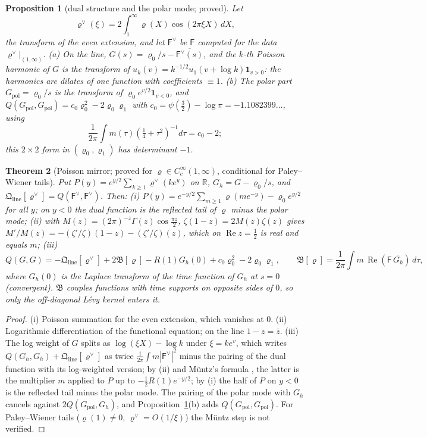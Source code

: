 \documentclass[11pt]{amsart}
\newtheorem{theorem}{Theorem}[section]
\newtheorem{proposition}[theorem]{Proposition}
\theoremstyle{definition}
\theoremstyle{remark}
\newcommand{\R}{\mathbb R}
\newcommand{\Rel}{\operatorname{Re}}
\begin{document}
\begin{proposition}[dual structure and the polar mode; proved]\label{prop:ext-dual}
Let
\[\varrho^\vee(\xi)=2\int_1^\infty\varrho(X)\cos(2\pi\xi X)\,dX,\]
the transform of the even extension, and let $\mathsf F^\vee$ be
$\mathsf F$ computed for the data $\varrho^\vee|_{(1,\infty)}$.
(a) On the line, $G(s)=\varrho_0/s-\overline{\mathsf F^\vee(s)}$, and the $k$-th
Poisson harmonic of $G$ is the transform of $u_k(v)=k^{-1/2}u_1(v+\log k)\mathbf 1_{v>0}$: the harmonics are dilates of one
function with coefficients $\equiv1$. (b) The polar part $G_{\mathrm{pol}}=\varrho_0/s$ is the transform of
$\varrho_0e^{v/2}\mathbf 1_{v<0}$, and $Q(G_{\mathrm{pol}},G_{\mathrm{pol}})=c_0\varrho_0^2-2\varrho_0\varrho_1$ with
$c_0=\psi(\frac32)-\log\pi=-1.1082399\ldots$, using
\[\frac1{2\pi}\int m(\tau)(\tfrac14+\tau^2)^{-1}d\tau=c_0-2;\]
this $2\times2$ form
in $(\varrho_0,\varrho_1)$ has determinant $-1$.
\end{proposition}

\begin{theorem}[Poisson mirror; proved for $\varrho\in C_c^\infty(1,\infty)$, conditional for Paley--Wiener tails]\label{thm:ext-mirror}
Put $P(y)=e^{y/2}\sum_{k\ge1}\varrho^\vee(ke^y)$ on $\R$, $G_h=G-\varrho_0/s$, and
$\mathfrak Q_{\mathrm{line}}[\varrho^\vee]=Q(\mathsf F^\vee,\mathsf F^\vee)$. Then:
(i) $P(y)=e^{-y/2}\sum_{m\ge1}\varrho(me^{-y})-\varrho_0e^{y/2}$ for all $y$; on $y<0$ the dual function is the reflected tail of
$\varrho$ minus the polar mode;
(ii) with $M(z)=(2\pi)^{-z}\Gamma(z)\cos\frac{\pi z}2$, $\zeta(1-z)=2M(z)\zeta(z)$ gives $M'/M(z)=-(\zeta'/\zeta)(1-z)-(\zeta'/\zeta)(z)$,
which on $\Rel z=\frac12$ is real and equals $m$;
(iii)
\[
Q(G,G)=-\mathfrak Q_{\mathrm{line}}[\varrho^\vee]+2\mathfrak B[\varrho]-R(1)G_h(0)+c_0\varrho_0^2-2\varrho_0\varrho_1,\qquad
\mathfrak B[\varrho]=\frac1{2\pi}\int m\,\Rel(\mathsf F\,\overline{G_h})\,d\tau,
\]
where $G_h(0)$ is the Laplace transform of the time function of $G_h$ at $s=0$ (convergent). $\mathfrak B$ couples functions with
time supports on opposite sides of $0$, so only the off-diagonal L\'evy kernel enters it.
\end{theorem}
\begin{proof}
(i) Poisson summation for the even extension, which vanishes at $0$. (ii) Logarithmic differentiation of the functional
equation; on the line $1-z=\bar z$. (iii) The log weight of $G$ splits as $\log(\xi X)-\log k$ under $\xi=ke^v$, which writes
$Q(G_h,G_h)+\mathfrak Q_{\mathrm{line}}[\varrho^\vee]$ as twice $\frac1{2\pi}\int m|\mathsf F^\vee|^2$ minus the pairing of the dual
function with its log-weighted version; by (ii) and M\"untz's formula \cite[\S2.11]{Titchmarsh1986}, the latter is the
multiplier $m$ applied to $P$ up to $-\frac12R(1)e^{-y/2}$; by (i) the half of $P$ on $y<0$ is the reflected tail minus the
polar mode. The pairing of the polar mode with $G_h$ cancels against $2Q(G_{\mathrm{pol}},G_h)$, and
Proposition~\ref{prop:ext-dual}(b) adds $Q(G_{\mathrm{pol}},G_{\mathrm{pol}})$. For Paley--Wiener tails ($\varrho(1)\ne0$,
$\varrho^\vee=O(1/\xi)$) the M\"untz step is not verified.
\end{proof}
\end{document}
